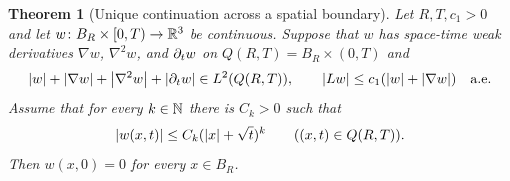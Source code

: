 \documentclass[11pt,letterpaper]{article}
\numberwithin{equation}{section}
\theoremstyle{plain}
\newtheorem{theorem}{Theorem}[section]
\theoremstyle{definition}
\theoremstyle{remark}
\begin{document}
\begin{theorem}[Unique continuation across a spatial boundary]\label{thm:uc}
Let $R,T,c_1>0$ and let $w\colon B_R\times[0,T)\to\mathbb{R}^3$ be continuous.
Suppose that $w$ has space-time weak derivatives $\nabla w$, $\nabla^2w$,
and $\partial_t w$ on $Q(R,T)=B_R\times(0,T)$ and
\begin{equation}\label{eq:uc-w212}
 \left\lvert w\right\rvert+\left\lvert \nabla w\right\rvert+\left\lvert \nabla^2w\right\rvert+\left\lvert \partial_t w\right\rvert\in L^2(Q(R,T)),
 \qquad \left\lvert L w\right\rvert\leq c_1(\left\lvert w\right\rvert+\left\lvert \nabla w\right\rvert)\quad\text{a.e.}
\end{equation}
Assume that for every $k\in\mathbb{N}$ there is $C_k>0$ such that
\begin{equation}\label{eq:uc-pointwise-vanishing}
 \left\lvert w(x,t)\right\rvert\leq C_k(\left\lvert x\right\rvert+\sqrt t)^k
       \qquad ((x,t)\in Q(R,T)).
\end{equation}
Then $w(x,0)=0$ for every $x\in B_R$.
\end{theorem}
\end{document}
